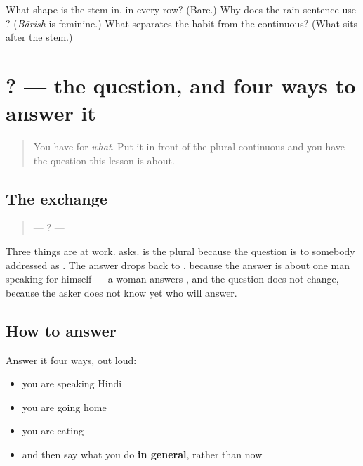 \begin{tcolorbox}[breakable,colback=teal!4,colframe=teal!35!black,title={Before you move on}]
What shape is the stem in, in every row? (Bare.) Why does the rain sentence use \textbf{}? (\emph{Bārish} is feminine.) What separates the habit from the continuous? (What sits after the stem.)
\end{tcolorbox}
\section[\texorpdfstring{\hi{आप} \hi{क्या} \hi{कर} \hi{रहे} \hi{हैं}? (āp kyā kar rahe haiṁ?)}{आप क्या कर रहे हैं? (āp kyā kar rahe haiṁ?)}]{    ? — the question, and four ways to answer it}

\label{lesson:HI-C89-sintesis-jaari}



\begin{quote}
You have \textbf{} for \emph{what}. Put it in front of the plural continuous and you have the question this lesson is about.
\end{quote}

\subsection*{The exchange}
\begin{quote}
—     ? —     
\end{quote}

Three things are at work. \textbf{} asks. \textbf{ } is the plural because the question is to somebody addressed as \textbf{}. The answer drops back to \textbf{ }, because the answer is about one man speaking for himself — a woman answers \textbf{  }, and the question does not change, because the asker does not know yet who will answer.

\subsection*{How to answer}
Answer it four ways, out loud:

\begin{itemize}
\raggedright
  \item you are speaking Hindi
  \item you are going home
  \item you are eating
  \item and then say what you do \textbf{in general}, rather than now
\end{itemize}

